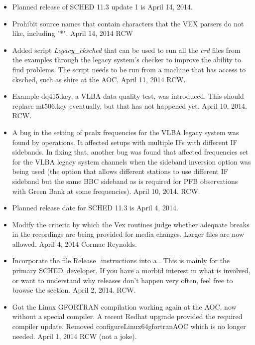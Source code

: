\documentclass{report}
\newcommand{\schedb}{{\sc SCHED~}}
\begin{document}
\begin{itemize}

\item Planned release of SCHED 11.3 update 1 is April 14, 2014.

\item Prohibit source names that contain characters that the VEX
parsers do not like, including "*".  April 14, 2014  RCW

\item Added script {\sl Legacy\_cksched} that can be used to run all
the {\sl crd} files from the examples through the legacy system's
checker to improve the ability to find problems.  The script needs
to be run from a machine that has access to cksched, such as shire
at the AOC.  April 11, 2014 RCW.

\item Example dq415.key, a VLBA data quality test, was introduced.
This should replace mt506.key eventually, but that has not happened
yet. April 10, 2014.  RCW.

\item A bug in the setting of pcalx frequencies for the VLBA legacy
system was found by operations.  It affected setups with multiple IFs
with different IF sidebands.  In fixing that, another bug was found
that affected frequencies set for the VLBA legacy system channels when
the sideband inversion option was being used (the option that allows
different stations to use different IF sideband but the same BBC
sideband as is required for PFB observations with Green Bank at some
frequencies).  April 10, 2014.  RCW.

\item Planned release date for SCHED 11.3 is April 4, 2014.

\item Modify the criteria by which the Vex routines judge whether 
adequate breaks in the recordings are being provided for media changes.
Larger files are now allowed.  April 4, 2014  Cormac Reynolds.

\item Incorporate the file Release\_instructions into a
.  This is mainly
for the primary \schedb developer.  If you have a morbid interest in 
what is involved, or want to understand why releases don't happen very
often, feel free to browse the section.  April 2, 2014.  RCW.

\item Got the Linux GFORTRAN compilation working again at the AOC, now
without a special compiler.  A recent Redhat upgrade provided the
required compiler update.  Removed configureLinux64gfortranAOC which is
no longer needed.  April 1, 2014  RCW  (not a joke). 


\end{itemize}
\end{document}
